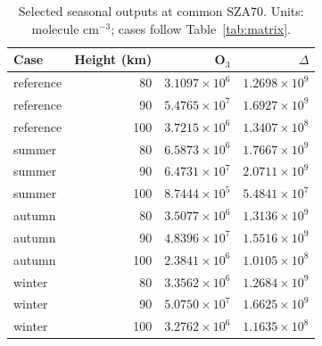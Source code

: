 \begin{table}[htbp]\centering\small\caption{Selected seasonal outputs at common SZA70. Units: molecule cm$^{-3}$; cases follow Table~\ref{tab:matrix}.}\label{tab:seasonal}\begin{tabular}{lrrr}\toprule Case & Height (km) & O$_3$ & $\Delta$\\\midrule
reference & 80 & $3.1097\times10^{6}$ & $1.2698\times10^{9}$\\
reference & 90 & $5.4765\times10^{7}$ & $1.6927\times10^{9}$\\
reference & 100 & $3.7215\times10^{6}$ & $1.3407\times10^{8}$\\
summer & 80 & $6.5873\times10^{6}$ & $1.7667\times10^{9}$\\
summer & 90 & $6.4731\times10^{7}$ & $2.0711\times10^{9}$\\
summer & 100 & $8.7444\times10^{5}$ & $5.4841\times10^{7}$\\
autumn & 80 & $3.5077\times10^{6}$ & $1.3136\times10^{9}$\\
autumn & 90 & $4.8396\times10^{7}$ & $1.5516\times10^{9}$\\
autumn & 100 & $2.3841\times10^{6}$ & $1.0105\times10^{8}$\\
winter & 80 & $3.3562\times10^{6}$ & $1.2684\times10^{9}$\\
winter & 90 & $5.0750\times10^{7}$ & $1.6625\times10^{9}$\\
winter & 100 & $3.2762\times10^{6}$ & $1.1635\times10^{8}$\\\bottomrule\end{tabular}\end{table}
